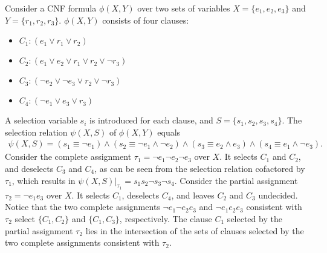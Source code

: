 \begin{example}\label{ex:select}
    Consider a CNF formula $\phi(X,Y)$ over two sets of variables $X=\{e_1,e_2,e_3\}$ and $Y=\{r_1,r_2,r_3\}$. $\phi(X,Y)$ consists of four clauses:
    \begin{itemize}
        \item[] $C_1: (e_1 \vee r_1 \vee r_2)$
        \item[] $C_2: (e_1 \vee e_2 \vee r_1 \vee r_2 \vee \neg r_3)$
        \item[] $C_3: (\neg e_2 \vee \neg e_3 \vee r_2 \vee \neg r_3)$
        \item[] $C_4: (\neg e_1 \vee e_3 \vee r_3)$
    \end{itemize}
    A selection variable $s_i$ is introduced for each clause, and $S=\{s_1,s_2,s_3,s_4\}$. The selection relation $\psi(X,S)$ of $\phi(X,Y)$ equals
    \begin{eqnarray*}
        \psi(X,S) = (s_1 \equiv \neg e_1)\wedge(s_2 \equiv \neg e_1 \wedge \neg e_2) \wedge (s_3 \equiv e_2 \wedge e_3) \wedge(s_4 \equiv e_1 \wedge \neg e_3).
    \end{eqnarray*}
    Consider the complete assignment $\tau_1=\neg e_1 \neg e_2 \neg e_3$ over $X$. It selects $C_1$ and $C_2$, and deselects $C_3$ and $C_4$, as can be seen from the selection relation cofactored by $\tau_1$, which results in $\psi(X,S)|_{\tau_1}=s_1s_2\neg s_3 \neg s_4$.
    Consider the partial assignment $\tau_2=\neg e_1 e_3$ over $X$.
    It selects $C_1$, deselects $C_4$, and leaves $C_2$ and $C_3$ undecided.
    Notice that the two complete assignments $\neg e_1 \neg e_2 e_3$ and $\neg e_1 e_2 e_3$ consistent with $\tau_2$ select $\{C_1, C_2\}$ and $\{C_1, C_3\}$, respectively.
    The clause $C_1$ selected by the partial assignment $\tau_2$ lies in the intersection of the sets of clauses selected by the two complete assignments consistent with $\tau_2$.
\end{example}